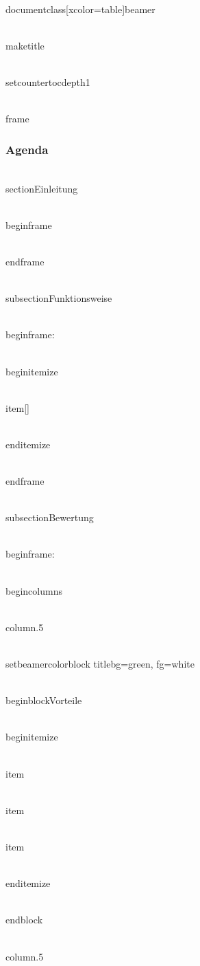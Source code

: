 \\documentclass[xcolor=table]{beamer}
\begin{document}
\\maketitle

\\setcounter{tocdepth}{1}


\\frame{\frametitle{Agenda}\tableofcontents}


\\section{Einleitung}

\\begin{frame}{\secname}

\\end{frame}


\\subsection{Funktionsweise}

\\begin{frame}{\secname : \subsecname}

    \\begin{itemize}

        \\item[] 

    \\end{itemize}

\\end{frame}  


\\subsection{Bewertung}

\\begin{frame}{\secname : \subsecname}

	\\begin{columns}

        \\column{.5\textwidth}

{
        \\setbeamercolor{block title}{bg=green, fg=white}

        \\begin{block}{Vorteile}

            \\begin{itemize}

                \\item 

                \\item

                \\item

            \\end{itemize}

        \\end{block}	
}

        \\column{.5\textwidth}
\end{document}

